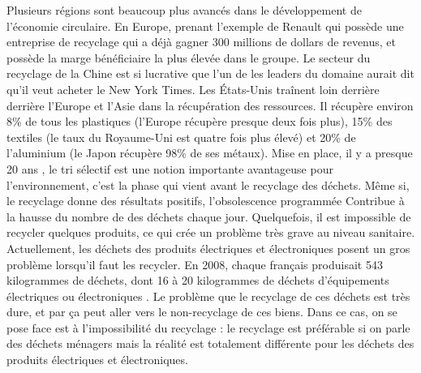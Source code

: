 Plusieurs régions sont beaucoup plus avancés dans le développement de l'économie circulaire. En Europe, prenant l'exemple de Renault qui possède une entreprise de recyclage qui a déjà gagner 300 millions de dollars de revenus, et possède la marge bénéficiaire la plus élevée dans le groupe. Le secteur du recyclage de la Chine est si lucrative que l'un de les leaders du domaine aurait dit qu'il veut acheter le New York Times. 
Les États-Unis traînent loin derrière derrière l'Europe et l'Asie dans la récupération des ressources. Il récupère environ 8\% de tous les plastiques (l'Europe récupère presque deux fois plus), 15\% des textiles (le taux du Royaume-Uni est quatre fois plus élevé) et 20\% de l'aluminium (le Japon récupère 98\% de ses métaux).
Mise en place, il y a presque 20 ans , le tri sélectif est une notion importante avantageuse pour l’environnement, c'est la phase qui vient avant le recyclage des déchets. Même si, le recyclage donne des résultats positifs, l’obsolescence programmée Contribue à la hausse du nombre de des déchets chaque jour. Quelquefois, il est impossible de recycler quelques produits, ce qui crée un problème très grave au niveau sanitaire. 
Actuellement, les déchets des produits électriques et électroniques posent un gros problème lorsqu'il faut les recycler. En 2008, chaque français produisait 543 kilogrammes de déchets, dont 16 à 20 kilogrammes de déchets d’équipements électriques ou électroniques . Le problème que le recyclage de ces déchets est très dure, et par ça peut aller vers le non-recyclage de ces biens. Dans ce cas, on se pose face est à l'impossibilité du recyclage : le recyclage est préférable si on parle des déchets ménagers mais la réalité est totalement différente pour les déchets des produits électriques et électroniques. 